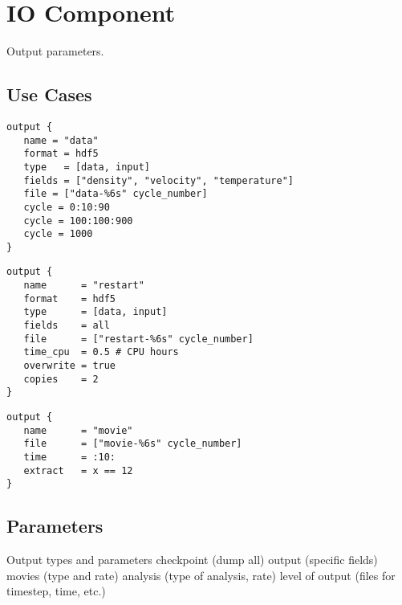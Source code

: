 \section{IO Component} \label{s:component-IO}

Output parameters.

\subsection{Use Cases}

\begin{verbatim}
output { 
   name = "data"
   format = hdf5
   type   = [data, input]
   fields = ["density", "velocity", "temperature"]
   file = ["data-%6s" cycle_number]
   cycle = 0:10:90
   cycle = 100:100:900
   cycle = 1000
}
\end{verbatim}

\begin{verbatim}
output { 
   name      = "restart"
   format    = hdf5
   type      = [data, input]
   fields    = all
   file      = ["restart-%6s" cycle_number]
   time_cpu  = 0.5 # CPU hours
   overwrite = true
   copies    = 2
}
\end{verbatim}

\begin{verbatim}
output { 
   name      = "movie"
   file      = ["movie-%6s" cycle_number]
   time      = :10:
   extract   = x == 12
}
\end{verbatim}


\subsection{Parameters}

Output types and parameters
 checkpoint (dump all)
 output (specific fields)
 movies (type and rate)
 analysis (type of analysis, rate)
 level of output (files for timestep, time, etc.)


